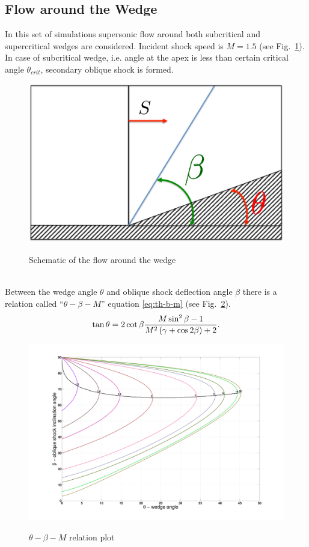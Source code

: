 \subsection{Flow around the Wedge}
In this set of simulations supersonic flow around both subcritical and supercritical wedges are considered. Incident shock speed is $M = 1.5$ (see Fig.~\ref{fig:wedge_scheme}). In case of subcritical wedge, i.e. angle at the apex is less than certain critical angle $\theta_{crit}$, secondary oblique shock is formed. 
\begin{figure}[h!]
\centering \includegraphics[scale=0.6]{fig/wedge_scheme.pdf}\\
\caption{Schematic of the flow around the wedge \label{fig:wedge_scheme}}
\end{figure}\\
Between the wedge angle $\theta$ and oblique shock deflection angle $\beta$ there is a relation called ``$\theta-\beta-M$'' equation \eqref{eq:th-b-m} (see Fig.~\ref{fig:th-b-m}).
\begin{align}
\tan \theta = 2 \cot \beta \frac {M \sin^2 \beta - 1}{M^2 \left(\gamma + \cos 2 \beta\right) + 2}. \label{eq:th-b-m}
\end{align}
\begin{figure}[h!]
\centering \includegraphics[scale=0.2]{fig/th-b-m.pdf}\\
\caption{$\theta-\beta-M$ relation plot \label{fig:th-b-m}}
\end{figure}\\
